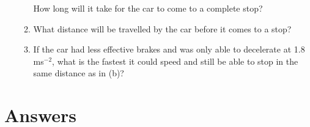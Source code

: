 \documentclass[12pt, letterpaper]{article}
\begin{document}
\begin{enumerate}[itemsep=6cm]
\begin{enumerate}[itemsep=6cm]
        How long will it take for the car to come to a complete stop? 

        \item 
        What distance will be travelled by the car before it comes to a stop?

        \item 
        If the car had less effective brakes and was only able to decelerate at 1.8 ms$^{-2}$, what is the fastest it could speed and still be able to stop in the same distance as in (b)?
    \end{enumerate}


\end{enumerate}
\pagebreak
\section*{Answers}
\end{document}
